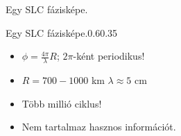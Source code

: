 \begin{frame}{\ft}
    \begin{minic}{0.8}
        \centering
        
        Egy SLC fázisképe.
    \end{minic}
\end{frame}


\begin{frame}{\ft}
    \begin{figp}{}{Egy SLC fázisképe.}{0.6}{0.35}
        \begin{itemize}
            \item $\phi = \frac{4\pi}{\lambda}R$; $2\pi$-ként periodikus!
            \item $R = 700-1000 $ km \hspace{10pt} $\lambda \approx 5$ cm
            \item Több millió ciklus!
            \item Nem tartalmaz hasznos információt.
        \end{itemize}
    \end{figp}
\end{frame}
